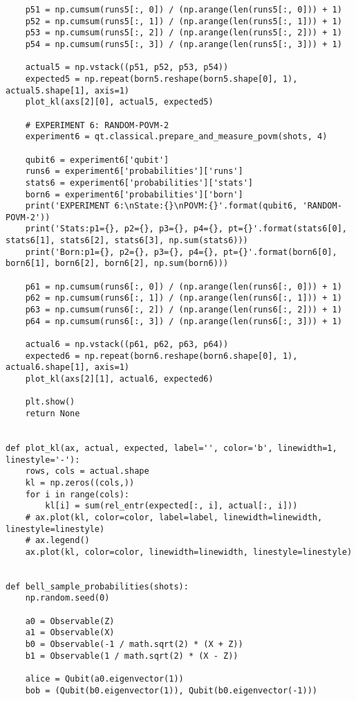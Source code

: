 \begin{verbatim}
    p51 = np.cumsum(runs5[:, 0]) / (np.arange(len(runs5[:, 0])) + 1)
    p52 = np.cumsum(runs5[:, 1]) / (np.arange(len(runs5[:, 1])) + 1)
    p53 = np.cumsum(runs5[:, 2]) / (np.arange(len(runs5[:, 2])) + 1)
    p54 = np.cumsum(runs5[:, 3]) / (np.arange(len(runs5[:, 3])) + 1)

    actual5 = np.vstack((p51, p52, p53, p54))
    expected5 = np.repeat(born5.reshape(born5.shape[0], 1), actual5.shape[1], axis=1)
    plot_kl(axs[2][0], actual5, expected5)

    # EXPERIMENT 6: RANDOM-POVM-2
    experiment6 = qt.classical.prepare_and_measure_povm(shots, 4)

    qubit6 = experiment6['qubit']
    runs6 = experiment6['probabilities']['runs']
    stats6 = experiment6['probabilities']['stats']
    born6 = experiment6['probabilities']['born']
    print('EXPERIMENT 6:\nState:{}\nPOVM:{}'.format(qubit6, 'RANDOM-POVM-2'))
    print('Stats:p1={}, p2={}, p3={}, p4={}, pt={}'.format(stats6[0], stats6[1], stats6[2], stats6[3], np.sum(stats6)))
    print('Born:p1={}, p2={}, p3={}, p4={}, pt={}'.format(born6[0], born6[1], born6[2], born6[2], np.sum(born6)))

    p61 = np.cumsum(runs6[:, 0]) / (np.arange(len(runs6[:, 0])) + 1)
    p62 = np.cumsum(runs6[:, 1]) / (np.arange(len(runs6[:, 1])) + 1)
    p63 = np.cumsum(runs6[:, 2]) / (np.arange(len(runs6[:, 2])) + 1)
    p64 = np.cumsum(runs6[:, 3]) / (np.arange(len(runs6[:, 3])) + 1)

    actual6 = np.vstack((p61, p62, p63, p64))
    expected6 = np.repeat(born6.reshape(born6.shape[0], 1), actual6.shape[1], axis=1)
    plot_kl(axs[2][1], actual6, expected6)

    plt.show()
    return None


def plot_kl(ax, actual, expected, label='', color='b', linewidth=1, linestyle='-'):
    rows, cols = actual.shape
    kl = np.zeros((cols,))
    for i in range(cols):
        kl[i] = sum(rel_entr(expected[:, i], actual[:, i]))
    # ax.plot(kl, color=color, label=label, linewidth=linewidth, linestyle=linestyle)
    # ax.legend()
    ax.plot(kl, color=color, linewidth=linewidth, linestyle=linestyle)


def bell_sample_probabilities(shots):
    np.random.seed(0)

    a0 = Observable(Z)
    a1 = Observable(X)
    b0 = Observable(-1 / math.sqrt(2) * (X + Z))
    b1 = Observable(1 / math.sqrt(2) * (X - Z))

    alice = Qubit(a0.eigenvector(1))
    bob = (Qubit(b0.eigenvector(1)), Qubit(b0.eigenvector(-1)))


\end{verbatim}
